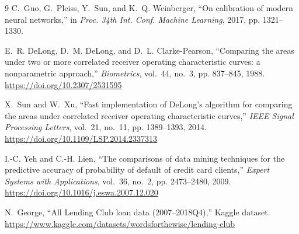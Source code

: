 \documentclass[a4paper,twocolumn,10pt]{article}
\begin{document}
\begin{thebibliography}{9}
C.~Guo, G.~Pleiss, Y.~Sun, and K.~Q. Weinberger, ``On calibration of modern neural networks,'' in \textit{Proc. 34th Int. Conf. Machine Learning}, 2017, pp. 1321--1330.

E.~R. DeLong, D.~M. DeLong, and D.~L. Clarke-Pearson, ``Comparing the areas under two or more correlated receiver operating characteristic curves: a nonparametric approach,'' \textit{Biometrics}, vol.~44, no.~3, pp. 837--845, 1988. \url{https://doi.org/10.2307/2531595}

X.~Sun and W.~Xu, ``Fast implementation of DeLong's algorithm for comparing the areas under correlated receiver operating characteristic curves,'' \textit{IEEE Signal Processing Letters}, vol.~21, no.~11, pp. 1389--1393, 2014. \url{https://doi.org/10.1109/LSP.2014.2337313}

I.-C. Yeh and C.-H. Lien, ``The comparisons of data mining techniques for the predictive accuracy of probability of default of credit card clients,'' \textit{Expert Systems with Applications}, vol.~36, no.~2, pp. 2473--2480, 2009. \url{https://doi.org/10.1016/j.eswa.2007.12.020}

N.~George, ``All Lending Club loan data (2007--2018Q4),'' Kaggle dataset. \url{https://www.kaggle.com/datasets/wordsforthewise/lending-club}

\end{thebibliography}
\end{document}
